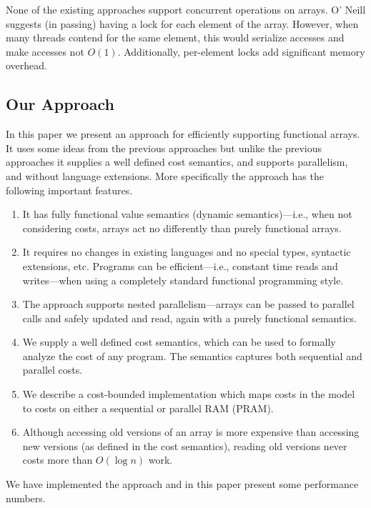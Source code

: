 None of the existing approaches support concurrent operations on
arrays.  O' Neill suggests (in passing) having a lock for each element
of the array. However, when many threads contend for the same element,
this would serialize accesses and make accesses not
$O(1)$. Additionally, per-element locks add significant memory
overhead.  

\subsection*{Our Approach}

In this paper we present an approach for efficiently supporting
functional arrays.  It uses some ideas from the previous approaches
but unlike the previous approaches it supplies a well
defined cost semantics, and supports parallelism, and without language
extensions.  More specifically the approach has the
following important features.
\begin{enumerate}
\item It has fully functional value semantics (dynamic
  semantics)---i.e., when not considering costs, arrays act no
  differently than purely functional arrays.
\item It requires no changes in existing languages and no special
  types, syntactic extensions, etc.  Programs can be efficient---i.e.,
  constant time reads and writes---when using a completely standard
  functional programming style.
\item The approach supports nested parallelism---arrays can be passed
  to parallel calls and safely updated and read, again with a purely
  functional semantics.
\item We supply a well defined cost semantics, which can be used to
  formally analyze the cost of any program.  The semantics captures
  both sequential and parallel costs.
\item We describe a cost-bounded implementation which maps costs in the
  model to costs on either a sequential or parallel RAM (PRAM).
\item
Although accessing old versions of an array is more expensive than
accessing new versions (as defined in the cost semantics), reading old
versions never costs more than $O(\log n)$ work.
\end{enumerate}
We have implemented the approach and in this paper present some
performance numbers.

